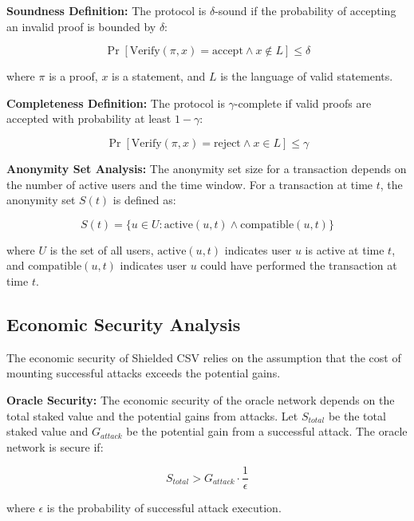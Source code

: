 \documentclass[11pt,a4paper]{article}
\begin{document}
\textbf{Soundness Definition:}
The protocol is $\delta$-sound if the probability of accepting an invalid proof is bounded by $\delta$:

\begin{equation}
\Pr[\text{Verify}(\pi, x) = \text{accept} \land x \notin L] \leq \delta
\end{equation}

where $\pi$ is a proof, $x$ is a statement, and $L$ is the language of valid statements.

\textbf{Completeness Definition:}
The protocol is $\gamma$-complete if valid proofs are accepted with probability at least $1 - \gamma$:

\begin{equation}
\Pr[\text{Verify}(\pi, x) = \text{reject} \land x \in L] \leq \gamma
\end{equation}

\textbf{Anonymity Set Analysis:}
The anonymity set size for a transaction depends on the number of active users and the time window. For a transaction at time $t$, the anonymity set $S(t)$ is defined as:

\begin{equation}
S(t) = \{u \in U : \text{active}(u, t) \land \text{compatible}(u, t)\}
\end{equation}

where $U$ is the set of all users, $\text{active}(u, t)$ indicates user $u$ is active at time $t$, and $\text{compatible}(u, t)$ indicates user $u$ could have performed the transaction at time $t$.

\subsection{Economic Security Analysis}

The economic security of Shielded CSV relies on the assumption that the cost of mounting successful attacks exceeds the potential gains.

\textbf{Oracle Security:}
The economic security of the oracle network depends on the total staked value and the potential gains from attacks. Let $S_{total}$ be the total staked value and $G_{attack}$ be the potential gain from a successful attack. The oracle network is secure if:

\begin{equation}
S_{total} > G_{attack} \cdot \frac{1}{\epsilon}
\end{equation}

where $\epsilon$ is the probability of successful attack execution.
\end{document}
